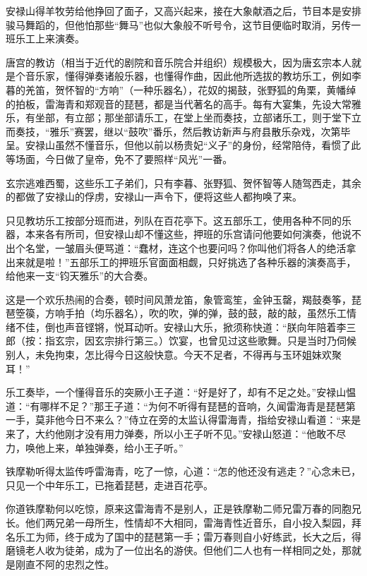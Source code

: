\documentclass[12pt,oneside]{book}
\begin{document}
安禄山得羊牧劳给他挣回了面子，又高兴起来，接在大象献酒之后，节目本是安排骏马舞蹈的，但他怕那些``舞马''也似大象般不听号令，这节目便临时取消，另传一班乐工上来演奏。

唐宫的教访（相当于近代的剧院和音乐院合并组织）规模极大，因为唐玄宗本人就是个音乐家，懂得弹奏诸般乐器，也懂得作曲，因此他所选拔的教坊乐工，例如李暮的羌笛，贺怀智的``方响''（一种乐器名），花奴的揭鼓，张野狐的角栗，黄幡绰的拍板，雷海青和郑观音的琵琶，都是当代著名的高手。每有大宴集，先设大常雅乐，有坐部，有立部；那坐部请乐工，在堂上坐而奏技，立部诸乐工，则于堂下立而奏技，``雅乐''赛罢，继以``鼓吹''番乐，然后教访新声与府县散乐杂戏，次第毕呈。安禄山虽然不懂音乐，但他以前以杨贵妃``义子''的身份，经常陪侍，看惯了此等场面，今日做了皇帝，免不了要照样``风光''一番。

玄宗逃难西蜀，这些乐工子弟们，只有李暮、张野狐、贺怀智等人随驾西走，其余的都做了安禄山的俘虏，安禄山一声令下，便将这些人都拘唤了来。

只见教坊乐工按部分班而进，列队在百花亭下。这五部乐工，使用各种不同的乐器，本来各有所司，但安禄山却不懂这些，押班的乐宫请问他要如何演奏，他说不出个名堂，一皱眉头便骂道：``蠢材，连这个也要问吗？你叫他们将各人的绝活拿出来就是啦！''五部乐工的押班乐官面面相觑，只好挑选了各种乐器的演奏高手，给他来一支``钧天雅乐''的大合奏。

这是一个欢乐热闹的合奏，顿时间风萧龙笛，象管鸾笙，金钟玉罄，羯鼓奏筝，琵琶箜篌，方响手拍（均乐器名），吹的吹，弹的弹，鼓的鼓，敲的敲，虽然乐工情绪不佳，倒也声音铿锵，悦耳动听。安禄山大乐，掀须称快道：``朕向年陪着李三郎（按：指玄宗，因玄宗排行第三。）饮宴，也曾见过这些歌舞。只是当时乃伺候别人，未免拘束，怎比得今日这般快意。今天不足者，不得再与玉环姐妹欢聚耳！''

乐工奏毕，一个懂得音乐的突厥小王子道：``好是好了，却有不足之处。''安禄山愠道：``有哪样不足？''那王子道：``为何不听得有琵琶的音响，久闻雷海青是琵琶第一手，莫非他今日不来么？''侍立在旁的太监认得雷海青，指给安禄山看道：``来是来了，大约他刚才没有用力弹奏，所以小王子听不见。''安禄山怒道：``他敢不尽力，唤他上来，单独弹奏，给小王子听。''

铁摩勒听得太监传呼雷海青，吃了一惊，心道：``怎的他还没有逃走？''心念未已，只见一个中年乐工，已拖着琵琶，走进百花亭。

你道铁摩勒何以吃惊，原来这雷海青不是别人，正是铁摩勒二师兄雷万春的同胞兄长。他们两兄弟一母所生，性情却不大相同，雷海青性近音乐，自小投入梨园，拜名乐工为师，终于成为了国中的琵琶第一手；雷万春则自小好练武，长大之后，得磨镜老人收为徒弟，成为了一位出名的游侠。但他们二人也有一样相同之处，那就是刚直不阿的忠烈之性。
\end{document}
